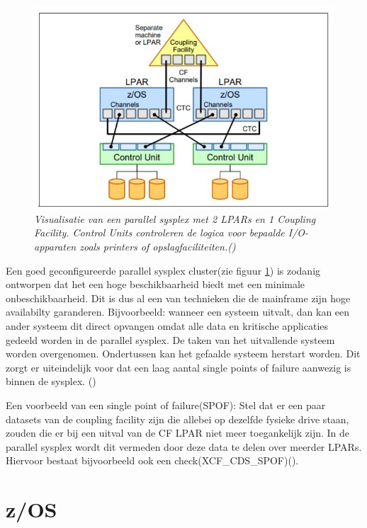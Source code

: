 \begin{figure}[h]
	\centering
	\includegraphics{img/ParallelSysplex}
	\caption[Visualisatie van een Parallel Sysplex]{{\small \textit{Visualisatie van een parallel sysplex met 2 LPARs en 1 Coupling Facility. Control Units controleren de logica voor bepaalde I/O-apparaten zoals printers of opslagfaciliteiten.(\cite{Ebbers2011})}}}
	\label{fig:parallelsysplex}
\end{figure}

Een goed geconfigureerde parallel sysplex cluster(zie figuur \ref{fig:parallelsysplex}) is zodanig ontworpen dat het een hoge beschikbaarheid biedt met een minimale onbeschikbaarheid. Dit is dus al een van technieken die de mainframe zijn hoge availabilty garanderen. Bijvoorbeeld: wanneer een systeem uitvalt, dan kan een ander systeem dit direct opvangen omdat alle data en kritische applicaties gedeeld worden in de parallel sysplex. De taken van het uitvallende systeem worden overgenomen. Ondertussen kan het gefaalde systeem herstart worden. Dit zorgt er uiteindelijk voor dat een laag aantal single points of failure aanwezig is binnen de sysplex. (\cite{Ebbers2011})

Een voorbeeld van een single point of failure(SPOF): Stel dat er een paar datasets van de coupling facility zijn die allebei op dezelfde fysieke drive staan, zouden die er bij een uitval van de CF LPAR niet meer toegankelijk zijn. In de parallel sysplex wordt dit vermeden door deze data te delen over meerder LPARs. Hiervoor bestaat bijvoorbeeld ook een check(XCF\_CDS\_SPOF)(\cite{IBMCorporation2019}).

\section{z/OS}
\label{subsec:z/OS}

